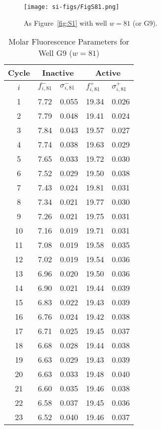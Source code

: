                 \begin{figure}
                    \centering
                    \texttt{[image: si-figs/FigS81.png]}
                    \caption{
                        As Figure~\ref{fig:S1} with well $w=81$ (or G9).
                    }
                \end{figure}
                \clearpage
    \begin{table}
        \caption{Molar Fluorescence Parameters for Well G9 ($w=81$)}
        \centering
        \begin{tabular}{c|ll|ll}
            Cycle & \multicolumn{2}{c|}{Inactive} & \multicolumn{2}{c}{Active} \\
            \hline
            $i$ & $f_{i,81}^{-}$ & $\sigma_{i,81}^{-}$ &  $f_{i,81}^{+}$ & $\sigma_{i,81}^{+}$ \\
            \hline
    1 & 7.72 & 0.055 & 19.34 & 0.026 \\
2 & 7.79 & 0.048 & 19.41 & 0.024 \\
3 & 7.84 & 0.043 & 19.57 & 0.027 \\
4 & 7.74 & 0.038 & 19.63 & 0.029 \\
5 & 7.65 & 0.033 & 19.72 & 0.030 \\
6 & 7.52 & 0.029 & 19.50 & 0.038 \\
7 & 7.43 & 0.024 & 19.81 & 0.031 \\
8 & 7.34 & 0.021 & 19.77 & 0.030 \\
9 & 7.26 & 0.021 & 19.75 & 0.031 \\
10 & 7.16 & 0.019 & 19.71 & 0.031 \\
11 & 7.08 & 0.019 & 19.58 & 0.035 \\
12 & 7.02 & 0.019 & 19.54 & 0.036 \\
13 & 6.96 & 0.020 & 19.50 & 0.036 \\
14 & 6.90 & 0.021 & 19.44 & 0.039 \\
15 & 6.83 & 0.022 & 19.43 & 0.039 \\
16 & 6.76 & 0.024 & 19.42 & 0.038 \\
17 & 6.71 & 0.025 & 19.45 & 0.037 \\
18 & 6.68 & 0.028 & 19.44 & 0.038 \\
19 & 6.63 & 0.029 & 19.43 & 0.039 \\
20 & 6.63 & 0.033 & 19.48 & 0.040 \\
21 & 6.60 & 0.035 & 19.46 & 0.038 \\
22 & 6.58 & 0.037 & 19.45 & 0.036 \\
23 & 6.52 & 0.040 & 19.46 & 0.037 \\

\end{tabular}
\end{table}
